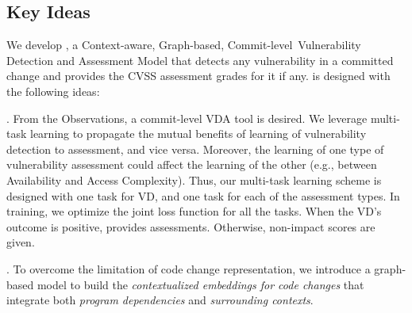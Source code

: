 \subsection{Key Ideas}
\label{key-ideas:sec}

We develop {\tool}, a Context-aware, Graph-based,
Commit-level~Vulnerability Detection and Assessment Model that detects
any vulnerability in a committed change and provides the CVSS
assessment grades for it if any.  {\tool} is designed with the
following ideas:

\vspace{1pt} . From the Observations,
a commit-level VDA tool is desired. We leverage multi-task
learning to propagate the mutual benefits of learning of vulnerability
detection to assessment, and vice versa. Moreover, the learning of one
type of vulnerability assessment could affect the learning of the
other (e.g., between Availability and Access Complexity). Thus, our
multi-task learning scheme is designed with one task for VD, and one
task for each of the assessment types. In training, we optimize
the joint loss function for all the tasks. When the VD's outcome is
positive, {\tool} provides assessments. Otherwise,
non-impact scores are given.


\vspace{1pt}
. To overcome
the limitation of code change representation, we introduce a
graph-based model to build the {\em
contextualized embeddings for code changes} that integrate both {\em
program dependencies} and {\em surrounding contexts}.

